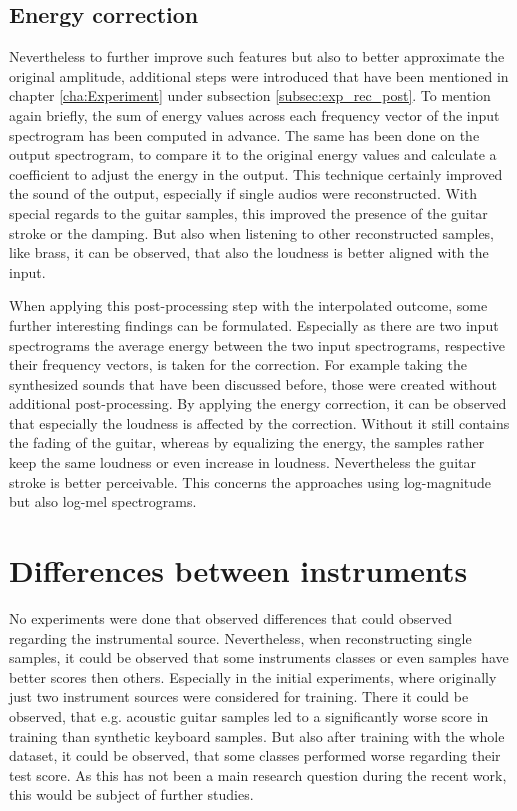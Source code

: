 \subsection{Energy correction}
Nevertheless to further improve such features but also to better approximate the original amplitude, additional steps were introduced that have been mentioned in chapter \ref{cha:Experiment} under subsection \ref{subsec:exp_rec_post}. To mention again briefly, the sum of energy values across each frequency vector of the input spectrogram has been computed in advance. The same has been done on the output spectrogram, to compare it to the original energy values and calculate a coefficient to adjust the energy in the output. This technique certainly improved the sound of the output, especially if single audios were reconstructed. With special regards to the guitar samples, this improved the presence of the guitar stroke or the damping. But also when listening to other reconstructed samples, like brass, it can be observed, that also the loudness is better aligned with the input.

When applying this post-processing step with the interpolated outcome, some further interesting findings can be formulated. Especially as there are two input spectrograms the average energy between the two input spectrograms, respective their frequency vectors, is taken for the correction. For example taking the synthesized sounds that have been discussed before, those were created without additional post-processing. By applying the energy correction, it can be observed that especially the loudness is affected by the correction. Without it still contains the fading of the guitar, whereas by equalizing the energy, the samples rather keep the same loudness or even increase in loudness. Nevertheless the guitar stroke is better perceivable. This concerns the approaches using log-magnitude but also log-mel spectrograms. 

\section{Differences between instruments}
No experiments were done that observed differences that could observed regarding the instrumental source. Nevertheless, when reconstructing single samples, it could be observed that some instruments classes or even samples have better scores then others. Especially in the initial experiments, where originally just two instrument sources were considered for training. There it could be observed, that e.g. acoustic guitar samples led to a significantly worse score in training than synthetic keyboard samples. But also after training with the whole dataset, it could be observed, that some classes performed worse regarding their test score. As this has not been a main research question during the recent work, this would be subject of further studies. 

